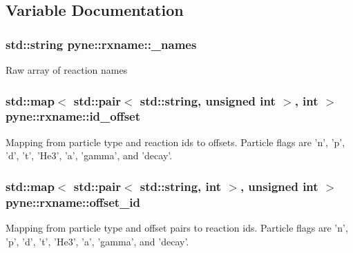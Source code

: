 \subsection{Variable Documentation}
\hypertarget{namespacepyne_1_1rxname_a880e1a059fe54b6fd425cc3319978555}{
\subsubsection[{\-\_\-names}]{\setlength{\rightskip}{0pt plus 5cm}std\-::string pyne\-::rxname\-::\-\_\-names}}\label{namespacepyne_1_1rxname_a880e1a059fe54b6fd425cc3319978555}
Raw array of reaction names \hypertarget{namespacepyne_1_1rxname_ae2f5760c11dc39df3f90fbcc6584c95c}{
\subsubsection[{id\-\_\-offset}]{\setlength{\rightskip}{0pt plus 5cm}std\-::map$<$ std\-::pair$<$ std\-::string, unsigned int $>$, int $>$ pyne\-::rxname\-::id\-\_\-offset}}\label{namespacepyne_1_1rxname_ae2f5760c11dc39df3f90fbcc6584c95c}
Mapping from particle type and reaction ids to offsets. Particle flags are 'n', 'p', 'd', 't', 'He3', 'a', 'gamma', and 'decay'. \hypertarget{namespacepyne_1_1rxname_a699be84310dad599582278e04135326e}{
\subsubsection[{offset\-\_\-id}]{\setlength{\rightskip}{0pt plus 5cm}std\-::map$<$ std\-::pair$<$ std\-::string, int $>$, unsigned int $>$ pyne\-::rxname\-::offset\-\_\-id}}\label{namespacepyne_1_1rxname_a699be84310dad599582278e04135326e}
Mapping from particle type and offset pairs to reaction ids. Particle flags are 'n', 'p', 'd', 't', 'He3', 'a', 'gamma', and 'decay'. 
